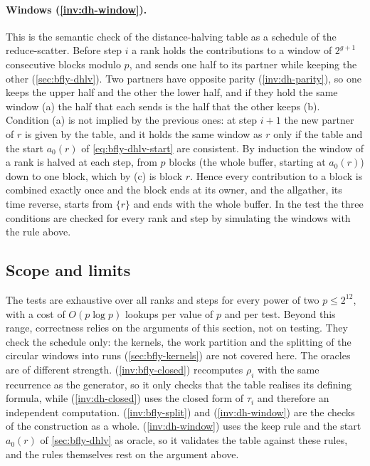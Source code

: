 \paragraph{Windows (\ref{inv:dh-window}).}
This is the semantic check of the distance-halving table as a schedule of the reduce-scatter.
Before step $i$ a rank holds the contributions to a window of $2^{g+1}$ consecutive blocks modulo $p$, and sends one half to its partner while keeping the other (\cref{sec:bfly-dhlv}).
Two partners have opposite parity (\ref{inv:dh-parity}), so one keeps the upper half and the other the lower half, and if they hold the same window (a) the half that each sends is the half that the other keeps (b).
Condition (a) is not implied by the previous ones: at step $i+1$ the new partner of $r$ is given by the table, and it holds the same window as $r$ only if the table and the start $a_0(r)$ of \cref{eq:bfly-dhlv-start} are consistent.
By induction the window of a rank is halved at each step, from $p$ blocks (the whole buffer, starting at $a_0(r)$) down to one block, which by (c) is block $r$.
Hence every contribution to a block is combined exactly once and the block ends at its owner, and the allgather, its time reverse, starts from $\{r\}$ and ends with the whole buffer.
In the test the three conditions are checked for every rank and step by simulating the windows with the rule above.

\subsection{Scope and limits}

The tests are exhaustive over all ranks and steps for every power of two $p\le 2^{12}$, with a cost of $O(p\log p)$ lookups per value of $p$ and per test.
Beyond this range, correctness relies on the arguments of this section, not on testing.
They check the schedule only: the kernels, the work partition and the splitting of the circular windows into runs (\cref{sec:bfly-kernels}) are not covered here.
The oracles are of different strength.
(\ref{inv:bfly-closed}) recomputes $\rho_i$ with the same recurrence as the generator, so it only checks that the table realises its defining formula, while (\ref{inv:dh-closed}) uses the closed form of $\tau_i$ and therefore an independent computation.
(\ref{inv:bfly-split}) and (\ref{inv:dh-window}) are the checks of the construction as a whole.
(\ref{inv:dh-window}) uses the keep rule and the start $a_0(r)$ of \cref{sec:bfly-dhlv} as oracle, so it validates the table against these rules, and the rules themselves rest on the argument above.

